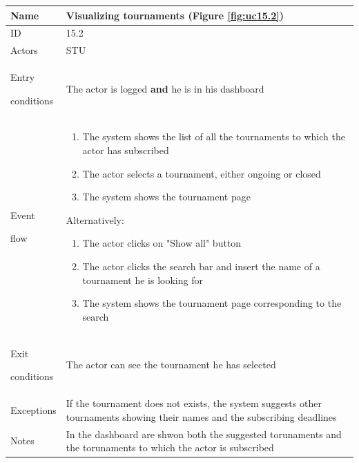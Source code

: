 \begin{center}
    \def\arraystretch{1.5}
    \begin{tabular}{| m{2cm} | m{10cm}|}
        \hline
        Name                  & Visualizing tournaments (Figure \ref{fig:uc15.2})                                                                          \\ \hline
        ID                    & 15.2                                                                                                                       \\ \hline
        Actors                & STU                                                                                                                        \\ \hline
        Entry \par conditions & The actor is logged \textbf{and} he is in his dashboard                                                                    \\ \hline
        Event \par flow       & \begin{enumerate}
                                    \item The system shows the list of all the tournaments to which the actor has subscribed
                                    \item The actor selects a tournament, either ongoing or closed
                                    \item The system shows the tournament page
                                \end{enumerate}
        Alternatively:
        \begin{enumerate}
            \item The actor clicks on "Show all" button
            \item The actor clicks the search bar and insert the name of a tournament he is looking for
            \item The system shows the tournament page corresponding to the search
        \end{enumerate}                                                         \\ \hline
        Exit \par conditions  & The actor can see the tournament he has selected                                                                           \\ \hline
        Exceptions            & If the tournament does not exists, the system suggests other tournaments showing their names and the subscribing deadlines \\ \hline
        Notes                 & In the dashboard are shwon both the suggested torunaments and the torunaments to which the actor is subscribed             \\ \hline
    \end{tabular}
\end{center}


